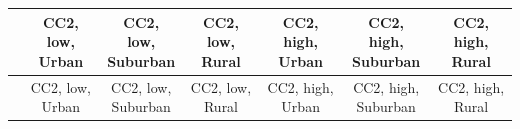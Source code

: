 
\begin{center}
\begin{small}
\begin{longtable}{l@{} c@{} c@{} c@{} c@{} c@{} c@{}}
\hline
 & \shortstack{\rule{0pt}{2.2ex}\hspace{0.25cm}CC2, low,\hspace{0.25cm}\\Urban} & \shortstack{\rule{0pt}{2.2ex}\hspace{0.25cm}CC2, low,\hspace{0.25cm}\\Suburban} & \shortstack{\rule{0pt}{2.2ex}\hspace{0.25cm}CC2, low,\hspace{0.25cm}\\Rural} & \shortstack{\rule{0pt}{2.2ex}\hspace{0.25cm}CC2, high,\hspace{0.25cm}\\Urban} & \shortstack{\rule{0pt}{2.2ex}\hspace{0.25cm}CC2, high,\hspace{0.25cm}\\Suburban} & \shortstack{\rule{0pt}{2.2ex}\hspace{0.25cm}CC2, high,\hspace{0.25cm}\\Rural} \\
\hline
\endfirsthead
\hline
 & \shortstack{\rule{0pt}{2.2ex}\hspace{0.25cm}CC2, low,\hspace{0.25cm}\\Urban} & \shortstack{\rule{0pt}{2.2ex}\hspace{0.25cm}CC2, low,\hspace{0.25cm}\\Suburban} & \shortstack{\rule{0pt}{2.2ex}\hspace{0.25cm}CC2, low,\hspace{0.25cm}\\Rural} & \shortstack{\rule{0pt}{2.2ex}\hspace{0.25cm}CC2, high,\hspace{0.25cm}\\Urban} & \shortstack{\rule{0pt}{2.2ex}\hspace{0.25cm}CC2, high,\hspace{0.25cm}\\Suburban} & \shortstack{\rule{0pt}{2.2ex}\hspace{0.25cm}CC2, high,\hspace{0.25cm}\\Rural} \\

\end{longtable}
\end{small}
\end{center}
